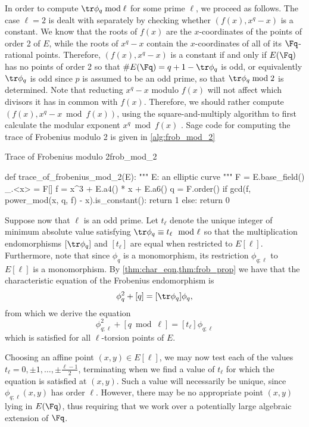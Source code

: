 In order to compute $\tr \phi_q \bmod{\ell}$ for some prime $\ell$, we proceed as follows. The case $\ell = 2$ is dealt with separately by checking whether $(f(x), x^q - x)$ is a constant. We know that the roots of $f(x)$ are the $x$-coordinates of the points of order 2 of $E$, while the roots of $x^q - x$ contain the $x$-coordinates of all of its $\Fq$-rational points. Therefore, $(f(x), x^q - x)$ is a constant if and only if $E(\Fq)$ has no points of order 2 so that $\#E(\Fq) = q + 1 - \tr \phi_q$ is odd, or equivalently $\tr \phi_q$ is odd since $p$ is assumed to be an odd prime, so that $\tr \phi_q \bmod 2$ is determined. Note that reducting $x^q - x$ modulo $f(x)$ will not affect which divisors it has in common with $f(x)$. Therefore, we should rather compute $(f(x), x^q - x \bmod f(x))$, using the square-and-multiply algorithm to first calculate the modular exponent $x^q \bmod f(x)$ \citep{Washington}. Sage code for computing the trace of Frobenius modulo 2 is given in \cref{alg:frob_mod_2}

\begin{alg}{Trace of Frobenius modulo 2}{frob_mod_2}
\begin{sagecode}
def trace_of_frobenius_mod_2(E):
    """
    E: an elliptic curve
    """
    F = E.base_field()
    _.<x> = F[]
    f = x^3 + E.a4() * x + E.a6()
    q = F.order()
    if gcd(f, power_mod(x, q, f) - x).is_constant():
        return 1
    else:
        return 0
\end{sagecode}
\end{alg}


Suppose now that $\ell$ is an odd prime. Let $t_\ell$ denote the unique integer of minimum absolute value satisfying $\tr \phi_q \equiv t_\ell \mod{\ell}$ so that the multiplication endomorphisms $[\tr \phi_q]$ and $[t_\ell]$ are equal when restricted to $E[\ell]$. Furthermore, note that since $\phi_q$ is a monomorphism, its restriction $\phi_{q;\ell}$ to $E[\ell]$ is a monomorphism. By \cref{thm:char_eqn,thm:frob_prop} we have that the characteristic equation of the Frobenius endomorphism is
\[
\phi_q^2 + [q] = [\tr \phi_q] \phi_q,
\]
from which we derive the equation
\begin{equation}
\phi_{q;\ell}^2 + [q \bmod{\ell}] = [t_\ell] \phi_{q;\ell} \label{char_ell}
\end{equation}
which is satisfied for all $\ell$-torsion points of $E$.

Choosing an affine point $(x, y) \in E[\ell]$, we may now test each of the values $t_\ell = 0, \pm 1, \ldots, \pm\frac{\ell - 1}{2}$, terminating when we find a value of $t_\ell$ for which the equation is satisfied at $(x, y)$. Such a value will necessarily be unique, since $\phi_{q;\ell}(x, y)$ has order $\ell$. However, there may be no appropriate point $(x, y)$ lying in $E(\Fq)$, thus requiring that we work over a potentially large algebraic extension of $\Fq$.

